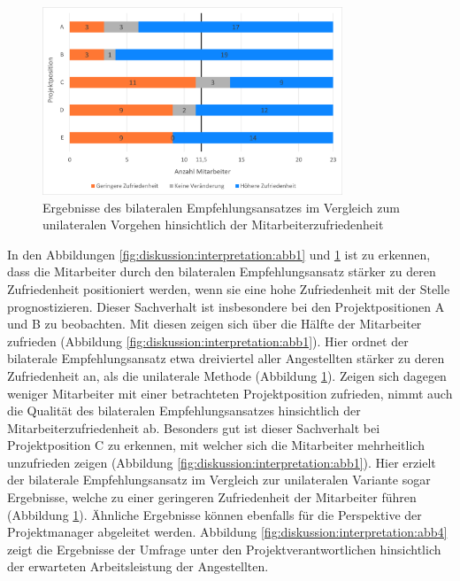 \begin{figure}[h]
	\centering
	\includegraphics[width=0.8\textwidth]{gfx/zufriedenheit-projekte.png}	
	\caption{Ergebnisse des bilateralen Empfehlungsansatzes im Vergleich zum unilateralen Vorgehen hinsichtlich der Mitarbeiterzufriedenheit}
	\label{fig:diskussion:interpretation:abb3}
\end{figure}

In den Abbildungen \ref{fig:diskussion:interpretation:abb1} und \ref{fig:diskussion:interpretation:abb3} ist zu erkennen, dass die Mitarbeiter durch den bilateralen Empfehlungsansatz stärker zu deren Zufriedenheit positioniert werden, wenn sie eine hohe Zufriedenheit mit der Stelle prognostizieren. Dieser Sachverhalt ist insbesondere bei den Projektpositionen A und B zu beobachten. Mit diesen zeigen sich über die Hälfte der Mitarbeiter zufrieden (Abbildung \ref{fig:diskussion:interpretation:abb1}). Hier ordnet der bilaterale Empfehlungsansatz etwa dreiviertel aller Angestellten stärker zu deren Zufriedenheit an, als die unilaterale Methode (Abbildung \ref{fig:diskussion:interpretation:abb3}). Zeigen sich dagegen weniger Mitarbeiter mit einer betrachteten Projektposition zufrieden, nimmt auch die Qualität des bilateralen Empfehlungsansatzes hinsichtlich der Mitarbeiterzufriedenheit ab. Besonders gut ist dieser Sachverhalt bei Projektposition C zu erkennen, mit welcher sich die Mitarbeiter mehrheitlich unzufrieden zeigen (Abbildung \ref{fig:diskussion:interpretation:abb1}). Hier erzielt der bilaterale Empfehlungsansatz im Vergleich zur unilateralen Variante sogar Ergebnisse, welche zu einer geringeren Zufriedenheit der Mitarbeiter führen (Abbildung \ref{fig:diskussion:interpretation:abb3}). Ähnliche Ergebnisse können ebenfalls für die Perspektive der Projektmanager abgeleitet werden. Abbildung \ref{fig:diskussion:interpretation:abb4} zeigt die Ergebnisse der Umfrage unter den Projektverantwortlichen hinsichtlich der erwarteten Arbeitsleistung der Angestellten.

